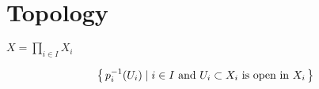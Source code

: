 \part{Topology}

\begin{defbox}
    \begin{definition}
        \label{def:product_topology}
        \(X = \prod_{i \in I} X_i\)

        \begin{align*}
            \left\{\, p_{i}^{-1}(U_i) \mathrel{\mid} i \in I \text{ and } U_i \subset X_i \text{ is open in }X_i \,\right\}
        \end{align*}
    \end{definition}
\end{defbox}